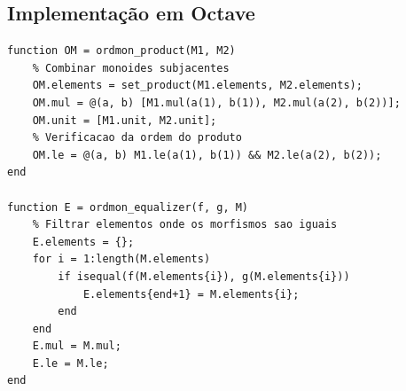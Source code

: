 \documentclass{article}
\begin{document}
\subsection{Implementação em Octave}
\begin{lstlisting}[caption={Construções OrdMon}]
function OM = ordmon_product(M1, M2)
    % Combinar monoides subjacentes
    OM.elements = set_product(M1.elements, M2.elements);
    OM.mul = @(a, b) [M1.mul(a(1), b(1)), M2.mul(a(2), b(2))];
    OM.unit = [M1.unit, M2.unit];
    % Verificacao da ordem do produto
    OM.le = @(a, b) M1.le(a(1), b(1)) && M2.le(a(2), b(2));
end

function E = ordmon_equalizer(f, g, M)
    % Filtrar elementos onde os morfismos sao iguais
    E.elements = {};
    for i = 1:length(M.elements)
        if isequal(f(M.elements{i}), g(M.elements{i}))
            E.elements{end+1} = M.elements{i};
        end
    end
    E.mul = M.mul;
    E.le = M.le;
end
\end{lstlisting}
\end{document}
